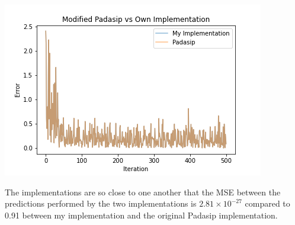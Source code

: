 \documentclass[sigconf]{acmart}
\begin{document}
\begin{center}
    \includegraphics[width=\linewidth]{figs/ModPadasip.png}
\end{center}

The implementations are so close to one another that the MSE between the predictions performed by the two implementations is $2.81 \times 10^{-27}$ compared to 0.91 between my implementation and the original Padasip implementation. 
\end{document}
